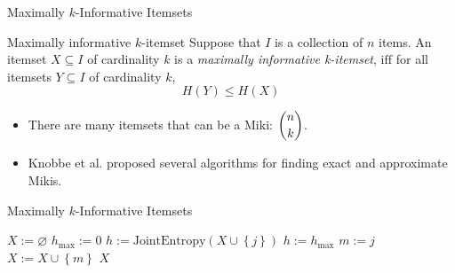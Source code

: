 \documentclass[12pt]{beamer}
\theoremstyle{break}
\newcommand*{\To}{\:\bm{ to }\:}
\begin{document}


\begin{frame}{Maximally $k$-Informative Itemsets}

	\begin{block}{Maximally informative $k$-itemset}
	    Suppose that $I$ is a collection of $n$ items. An itemset $X \subseteq I$ of cardinality $k$ is a \emph{maximally informative k-itemset}, $\mathrm{iff}$ for all itemsets $Y \subseteq I$ of cardinality $k$,
	    \begin{equation*}
	        H(Y) \leq H(X)
	    \end{equation*}
	\end{block}
	
	\pause
	
	\begin{itemize}
		\item There are many itemsets that can be a Miki: $\dbinom{n}{k}$.
		\item Knobbe et al. proposed several algorithms for finding exact and approximate Mikis.
	\end{itemize}

\end{frame}




\begin{frame}{Maximally $k$-Informative Itemsets}

	\begin{center}
		\begin{algorithmic}[1]
	        \State $X:=\varnothing$
	        \For{$i:=1 \To k$}
	            \State $h_{\mathrm{max}}:=0$
	            \For{$j:=1 \To n$}
	                \State $h:=\textrm{JointEntropy}(X \cup \left\{j\right\})$
	                    \State $h:=h_{\mathrm{max}}$
	                    \State $m:=j$
	                    \State $X:=X \cup \left\{m\right\}$
	                \EndIf
	            \EndFor
	        \EndFor
	        \State \Return $X$
	    \EndFunction
		\end{algorithmic}
	\end{center}
	
\end{frame}


\end{document}
